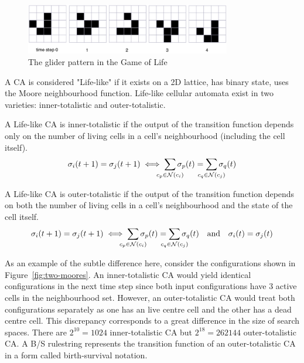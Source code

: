 \begin{figure}[!h]
\centering
\includegraphics[width=0.8\textwidth]{images/life-glider.png}
\caption{The glider pattern in the Game of Life \cite{dorin2012framework}}
\label{fig:life-glider}
\end{figure}

A CA is considered "Life-like" if it exists on a 2D lattice, has binary state, uses the Moore neighbourhood function. Life-like cellular automata exist in two varieties: inner-totalistic and outer-totalistic.

\begin{definition}
A Life-like CA is inner-totalistic if the output of the transition function depends only on the number of living cells in a cell's neighbourhood (including the cell itself).
\[
  \sigma_i(t+1) = \sigma_j(t+1) \iff \sum_{\mathclap{c_p \in \mathcal{N}(c_i)}}\sigma_p(t) = \sum_{\mathclap{c_q \in \mathcal{N}(c_j)}}\sigma_q(t)
\]
\label{def:inner-totalistic}
\end{definition}

\begin{definition}
A Life-like CA is outer-totalistic if the output of the transition function depends on both the number of living cells in a cell's neighbourhood and the state of the cell itself.
\[
  \sigma_i(t+1) = \sigma_j(t+1) \iff \sum_{\mathclap{c_p \in \mathcal{N}(c_i)}}\sigma_p(t) = \sum_{\mathclap{c_q \in \mathcal{N}(c_j)}}\sigma_q(t) \quad \textnormal{and} \quad \sigma_i(t) = \sigma_j(t) 
\]
\label{def:outer-totalistic}
\end{definition}

As an example of the subtle difference here, consider the configurations shown in Figure~\ref{fig:two-moores}. An inner-totalistic CA would yield identical configurations in the next time step since both input configurations have 3 active cells in the neighbourhood set. However, an outer-totalistic CA would treat both configurations separately as one has an live centre cell and the other has a dead centre cell. This discrepancy corresponds to a great difference in the size of search spaces. There are $2^{10}=1024$ inner-totalistic CA but $2^{18} = 262144$ outer-totalistic CA. A B/S rulestring represents the transition function of an outer-totalistic CA in a form called birth-survival notation.\\

